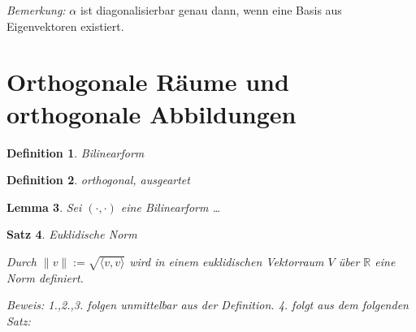 \documentclass[%
a4paper,
11pt,		%
]
{scrartcl}
\newcommand{\R}{\mathbb{R}}
\theoremstyle{plain}
\newtheorem{mydef}{Definition}[section]
\theoremstyle{plain}
\newtheorem{mysatz}[mydef]{Satz}
\theoremstyle{plain}
\newtheorem{mylemma}[mydef]{Lemma}
\theoremstyle{plain}
\theoremstyle{plain}
\begin{document}
\textit{Bemerkung:} $\alpha$ ist diagonalisierbar genau dann, wenn eine Basis aus Eigenvektoren existiert.



\newpage

\setcounter{section}{3}

\section{Orthogonale Räume und orthogonale Abbildungen} %

\begin{mydef}
    Bilinearform
\end{mydef}

\begin{mydef}
    orthogonal, ausgeartet
\end{mydef}

\begin{mylemma}
    Sei $(\cdot,\cdot)$ eine Bilinearform \dots 
\end{mylemma}

\begin{mysatz}
    Euklidische Norm

    Durch $\| v \| := \sqrt{\langle v,v \rangle}$ wird in einem euklidischen Vektorraum $V$ über $\R$ eine Norm definiert.

    \textit{Beweis:} 1.,2.,3. folgen unmittelbar aus der Definition. 4. folgt aus dem folgenden Satz:
\end{mysatz}
\end{document}

